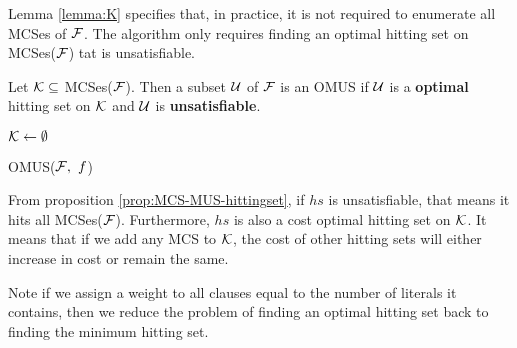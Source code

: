 Lemma \ref{lemma:K} specifies that, in practice, it is not required to enumerate all MCSes of $\mathcal{F}$.
The algorithm only requires finding an optimal hitting set on MCSes($\mathcal{F}$) tat is unsatisfiable.

\begin{lemma}\label{lemma:K}
  Let $\mathcal{K} \subseteq$ MCSes($\mathcal{F}$). Then a subset $\mathcal{U}$ of $\mathcal{F}$ is an OMUS if $\mathcal{U}$ is a \textbf{optimal} hitting set on $\mathcal{K}$ and $\mathcal{U}$ is \textbf{unsatisfiable}.
\end{lemma}


\begin{algorithm}[ht]
  \DontPrintSemicolon
  $\mathcal{K} \gets \emptyset$  \label{omus-line1} \;
  \caption{\textsc{OMUS($\mathcal{F}, \ f$)}}
  \label{alg:omus}
\end{algorithm}



From proposition \ref{prop:MCS-MUS-hittingset}, if $hs$ is unsatisfiable, that means it hits all MCSes($\mathcal{F}$). 
Furthermore, $hs$ is also a cost optimal hitting set on $\mathcal{K}$. It means that if we add any MCS to $\mathcal{K}$, the cost of other hitting sets will either increase in cost or remain the same.


Note if we assign a weight to all clauses equal to the number of literals it contains, then we reduce the problem of finding an optimal hitting set back to finding the minimum hitting set.


